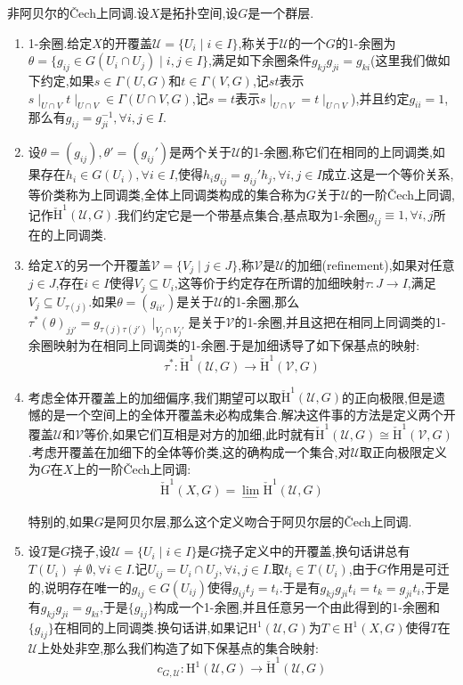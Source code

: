 非阿贝尔的\v{C}ech上同调.设$X$是拓扑空间,设$G$是一个群层.
\begin{enumerate}
	\item 1-余圈.给定$X$的开覆盖$\mathscr{U}=\{U_i\mid i\in I\}$,称关于$\mathscr{U}$的一个$G$的1-余圈为$\theta=\{g_{ij}\in G(U_i\cap U_j)\mid i,j\in I\}$,满足如下余圈条件$g_{kj}g_{ji}=g_{ki}$(这里我们做如下约定,如果$s\in\Gamma(U,G)$和$t\in\Gamma(V,G)$,记$st$表示$s\mid_{U\cap V}t\mid_{U\cap V}\in\Gamma(U\cap V,G)$,记$s=t$表示$s\mid_{U\cap V}=t\mid_{U\cap V}$),并且约定$g_{ii}=1$,那么有$g_{ij}=g_{ji}^{-1},\forall i,j\in I$.
	\item 设$\theta=(g_{ij}),\theta'=(g_{ij}')$是两个关于$\mathscr{U}$的1-余圈,称它们在相同的上同调类,如果存在$h_i\in G(U_i),\forall i\in I$,使得$h_ig_{ij}=g_{ij}'h_j,\forall i,j\in I$成立.这是一个等价关系,等价类称为上同调类,全体上同调类构成的集合称为$G$关于$\mathscr{U}$的一阶\v{C}ech上同调,记作$\check{\mathrm{H}}^1(\mathscr{U},G)$.我们约定它是一个带基点集合,基点取为1-余圈$g_{ij}\equiv1,\forall i,j$所在的上同调类.
	\item 给定$X$的另一个开覆盖$\mathscr{V}=\{V_j\mid j\in J\}$,称$\mathscr{V}$是$\mathscr{U}$的加细(refinement),如果对任意$j\in J$,存在$i\in I$使得$V_j\subseteq U_i$,这等价于约定存在所谓的加细映射$\tau:J\to I$,满足$V_j\subseteq U_{\tau(j)}$.如果$\theta=(g_{ii'})$是关于$\mathscr{U}$的1-余圈,那么$\tau^*(\theta)_{jj'}=g_{\tau(j)\tau(j')}\mid_{V_j\cap V_j'}$是关于$\mathscr{V}$的1-余圈,并且这把在相同上同调类的1-余圈映射为在相同上同调类的1-余圈.于是加细诱导了如下保基点的映射:
	$$\tau^*:\check{\mathrm{H}}^1(\mathscr{U},G)\to\check{\mathrm{H}}^1(\mathscr{V},G)$$
	\item 考虑全体开覆盖上的加细偏序,我们期望可以取$\check{\mathrm{H}}^1(\mathscr{U},G)$的正向极限,但是遗憾的是一个空间上的全体开覆盖未必构成集合.解决这件事的方法是定义两个开覆盖$\mathscr{U}$和$\mathscr{V}$等价,如果它们互相是对方的加细,此时就有$\check{\mathrm{H}}^1(\mathscr{U},G)\cong\check{\mathrm{H}}^1(\mathscr{V},G)$.考虑开覆盖在加细下的全体等价类,这的确构成一个集合,对$\mathscr{U}$取正向极限定义为$G$在$X$上的一阶\v{C}ech上同调:
	$$\check{\mathrm{H}}^1(X,G)=\lim\limits_{\rightarrow}\check{\mathrm{H}}^1(\mathscr{U},G)$$
	
	特别的,如果$G$是阿贝尔层,那么这个定义吻合于阿贝尔层的\v{C}ech上同调.
	\item 设$T$是$G$挠子,设$\mathscr{U}=\{U_i\mid i\in I\}$是$G$挠子定义中的开覆盖,换句话讲总有$T(U_i)\not=\emptyset,\forall i\in I$.记$U_{ij}=U_i\cap U_j,\forall i,j\in I$.取$t_i\in T(U_i)$,由于$G$作用是可迁的,说明存在唯一的$g_{ij}\in G(U_{ij})$使得$g_{ij}t_j=t_i$.于是有$g_{kj}g_{ji}t_i=t_k=g_{ji}t_i$,于是有$g_{kj}g_{ji}=g_{ki}$,于是$\{g_{ij}\}$构成一个1-余圈,并且任意另一个由此得到的1-余圈和$\{g_{ij}\}$在相同的上同调类.换句话讲,如果记$\mathrm{H}^1(\mathscr{U},G)$为$T\in\mathrm{H}^1(X,G)$使得$T$在$\mathscr{U}$上处处非空,那么我们构造了如下保基点的集合映射:
	$$c_{G,\mathscr{U}}:\mathrm{H}^1(\mathscr{U},G)\to\check{\mathrm{H}}^1(\mathscr{U},G)$$
	

\end{enumerate}
